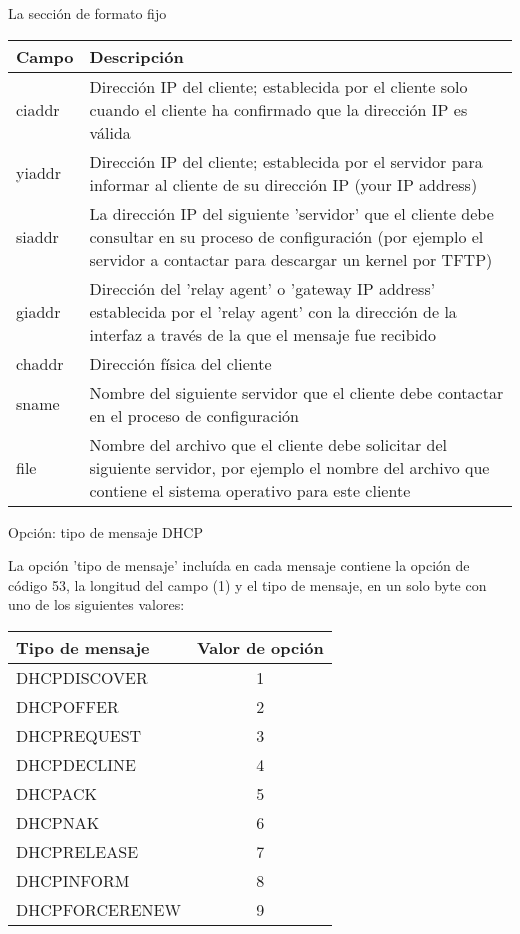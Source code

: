 \begin{frame}{La sección de formato fijo}
\framebreak

\begin{tabular}{ l p{} }
\hline
\textbf{Campo} & \textbf{Descripción} \\ 
\hline
ciaddr & Dirección IP del cliente; establecida por el cliente solo cuando el
cliente ha confirmado que la dirección IP es válida \\
\hline
yiaddr & Dirección IP del cliente; establecida por el servidor para informar al
cliente de su dirección IP (your IP address) \\
\hline
siaddr & La dirección IP del siguiente 'servidor' que el cliente debe consultar
en su proceso de configuración (por ejemplo el servidor a contactar para
descargar un kernel por TFTP) \\
\hline
giaddr & Dirección del 'relay agent' o 'gateway IP address' establecida por el
'relay agent' con la dirección de la interfaz a través de la que el mensaje fue
recibido \\
\hline
chaddr & Dirección física del cliente \\
\hline
sname & Nombre del siguiente servidor que el cliente debe contactar en el
proceso de configuración \\
\hline
file & Nombre del archivo que el cliente debe solicitar del siguiente servidor,
por ejemplo el nombre del archivo que contiene el sistema operativo para este
cliente \\
\hline
\end{tabular}

\end{frame}

\begin{frame}{Opción: tipo de mensaje DHCP}
    
    La opción 'tipo de mensaje' incluída en cada mensaje contiene la opción de código
    53, la longitud del campo (1) y el tipo de mensaje, en un solo byte con uno
    de los siguientes valores:\\[0.2cm]

\begin{tabular}{ l c }
\hline
\textbf{Tipo de mensaje} & \textbf{Valor de opción} \\ 
\hline
DHCPDISCOVER & 1 \\
\hline
DHCPOFFER & 2 \\
\hline
DHCPREQUEST & 3 \\
\hline
DHCPDECLINE & 4 \\
\hline
DHCPACK & 5 \\
\hline
DHCPNAK & 6 \\
\hline
DHCPRELEASE & 7 \\
\hline
DHCPINFORM & 8 \\
\hline
DHCPFORCERENEW & 9 \\
\hline
\end{tabular}

\end{frame}

